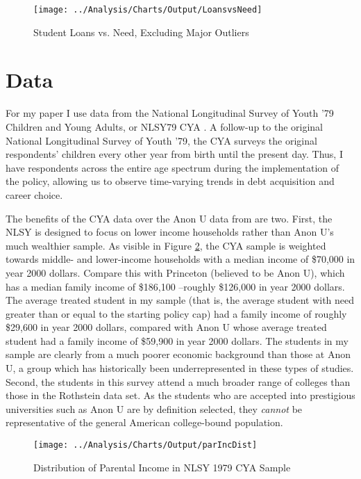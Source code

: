 \documentclass[12pt]{article}
\begin{document}
	\begin{figure}
		\centering
		\caption{Student Loans vs. Need, Excluding Major Outliers}
		\label{needvloans}
		\texttt{[image: ../Analysis/Charts/Output/LoansvsNeed]}
	\end{figure}
	
	
	\section{Data}
	
	For my paper I use data from the National Longitudinal Survey of Youth '79 Children and Young Adults, or NLSY79 CYA \parencite{bls2018}. A follow-up to the original National Longitudinal Survey of Youth '79, the CYA surveys the original respondents' children every other year from birth until the present day. Thus, I have respondents across the entire age spectrum during the implementation of the policy, allowing us to observe time-varying trends in debt acquisition and career choice. 
	
	The benefits of the CYA data over the Anon U data from \textcite{rothstein2011} are two. First, the NLSY is designed to focus on lower income households rather than Anon U's much wealthier sample. As visible in Figure \ref{incDist}, the CYA sample is weighted towards middle- and lower-income households with a median income of \$70,000 in year 2000 dollars. Compare this with Princeton (believed to be Anon U), which has a median family income of \$186,100 \parencite{aisch2017}--roughly \$126,000 in year 2000 dollars. The average treated student in my sample (that is, the average student with need greater than or equal to the starting policy cap) had a family income of roughly \$29,600 in year 2000 dollars, compared with Anon U whose average treated student had a family income of \$59,900 in year 2000 dollars. The students in my sample are clearly from a much poorer economic background than those at Anon U, a group which has historically been underrepresented in these types of studies. Second, the students in this survey attend a much broader range of colleges than those in the Rothstein data set. As the students who are accepted into prestigious universities such as Anon U are by definition selected, they \emph{cannot} be representative of the general American college-bound population. 
	
	\begin{figure}
		\centering
		\caption{Distribution of Parental Income in NLSY 1979 CYA Sample}
		\label{incDist}
		\texttt{[image: ../Analysis/Charts/Output/parIncDist]}
	\end{figure}
	
\end{document}
